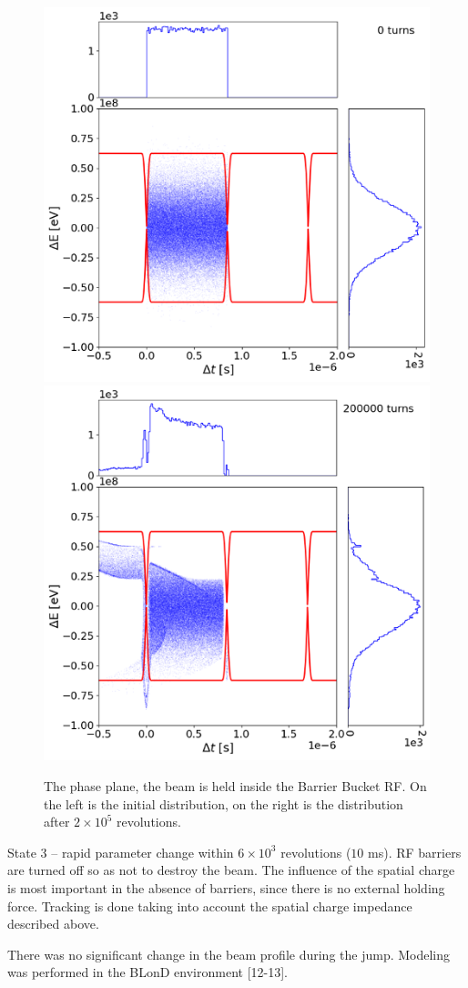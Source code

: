 \documentclass[
aps,%
12pt,%
final,%
notitlepage,%
oneside,%
onecolumn,%
nobibnotes,%
nofootinbib,%
superscriptaddress,%
noshowpacs,%
centertags]%
{revtex4}
\begin{document}
\begin{figure}
\setcaptionmargin{5mm}
   \includegraphics*[width=.49\columnwidth]{img/fig_08-1}
   \includegraphics*[width=.49\columnwidth]{img/fig_08-2}
\caption{The phase plane, the beam is held inside the Barrier Bucket RF. On the left is the initial distribution, on the right is the distribution after $2\times{10}^5$ revolutions.}
\label{fig:exp}
\end{figure}

\par State 3 -- rapid parameter change within $6\times{10}^3$ revolutions ($10$ ms). RF barriers are turned off so as not to destroy the beam. The influence of the spatial charge is most important in the absence of barriers, since there is no external holding force. Tracking is done taking into account the spatial charge impedance described above.

\par There was no significant change in the beam profile during the jump. Modeling was performed in the BLonD environment [12-13].
\end{document}
